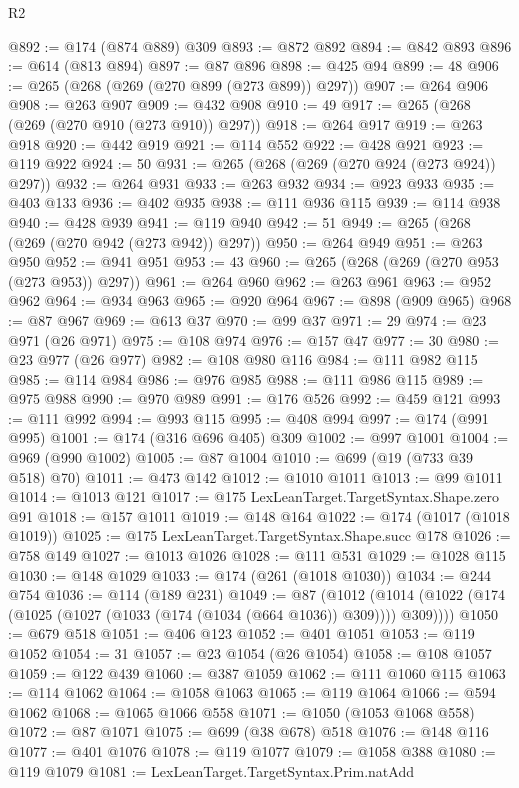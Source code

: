 \begin{lexlean}{R2}
\begin{coremodule}
@892 := @174 (@874 @889) @309
@893 := @872 @892
@894 := @842 @893
@896 := @614 (@813 @894)
@897 := @87 @896
@898 := @425 @94
@899 := 48
@906 := @265 (@268 (@269 (@270 @899 (@273 @899)) @297))
@907 := @264 @906
@908 := @263 @907
@909 := @432 @908
@910 := 49
@917 := @265 (@268 (@269 (@270 @910 (@273 @910)) @297))
@918 := @264 @917
@919 := @263 @918
@920 := @442 @919
@921 := @114 @552
@922 := @428 @921
@923 := @119 @922
@924 := 50
@931 := @265 (@268 (@269 (@270 @924 (@273 @924)) @297))
@932 := @264 @931
@933 := @263 @932
@934 := @923 @933
@935 := @403 @133
@936 := @402 @935
@938 := @111 @936 @115
@939 := @114 @938
@940 := @428 @939
@941 := @119 @940
@942 := 51
@949 := @265 (@268 (@269 (@270 @942 (@273 @942)) @297))
@950 := @264 @949
@951 := @263 @950
@952 := @941 @951
@953 := 43
@960 := @265 (@268 (@269 (@270 @953 (@273 @953)) @297))
@961 := @264 @960
@962 := @263 @961
@963 := @952 @962
@964 := @934 @963
@965 := @920 @964
@967 := @898 (@909 @965)
@968 := @87 @967
@969 := @613 @37
@970 := @99 @37
@971 := 29
@974 := @23 @971 (@26 @971)
@975 := @108 @974
@976 := @157 @47
@977 := 30
@980 := @23 @977 (@26 @977)
@982 := @108 @980 @116
@984 := @111 @982 @115
@985 := @114 @984
@986 := @976 @985
@988 := @111 @986 @115
@989 := @975 @988
@990 := @970 @989
@991 := @176 @526
@992 := @459 @121
@993 := @111 @992
@994 := @993 @115
@995 := @408 @994
@997 := @174 (@991 @995)
@1001 := @174 (@316 @696 @405) @309
@1002 := @997 @1001
@1004 := @969 (@990 @1002)
@1005 := @87 @1004
@1010 := @699 (@19 (@733 @39 @518) @70)
@1011 := @473 @142
@1012 := @1010 @1011
@1013 := @99 @1011
@1014 := @1013 @121
@1017 := @175 LexLeanTarget.TargetSyntax.Shape.zero @91
@1018 := @157 @1011
@1019 := @148 @164
@1022 := @174 (@1017 (@1018 @1019))
@1025 := @175 LexLeanTarget.TargetSyntax.Shape.succ @178
@1026 := @758 @149
@1027 := @1013 @1026
@1028 := @111 @531
@1029 := @1028 @115
@1030 := @148 @1029
@1033 := @174 (@261 (@1018 @1030))
@1034 := @244 @754
@1036 := @114 (@189 @231)
@1049 := @87
    (@1012 (@1014 (@1022 (@174 (@1025 (@1027 (@1033 (@174 (@1034 (@664 @1036)) @309)))) @309))))
@1050 := @679 @518
@1051 := @406 @123
@1052 := @401 @1051
@1053 := @119 @1052
@1054 := 31
@1057 := @23 @1054 (@26 @1054)
@1058 := @108 @1057
@1059 := @122 @439
@1060 := @387 @1059
@1062 := @111 @1060 @115
@1063 := @114 @1062
@1064 := @1058 @1063
@1065 := @119 @1064
@1066 := @594 @1062
@1068 := @1065 @1066 @558
@1071 := @1050 (@1053 @1068 @558)
@1072 := @87 @1071
@1075 := @699 (@38 @678) @518
@1076 := @148 @116
@1077 := @401 @1076
@1078 := @119 @1077
@1079 := @1058 @388
@1080 := @119 @1079
@1081 := LexLeanTarget.TargetSyntax.Prim.natAdd

\end{coremodule}
\end{lexlean}
